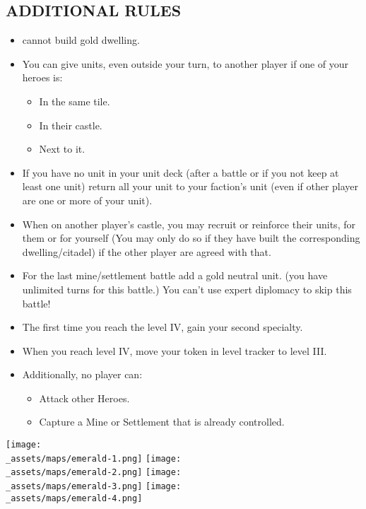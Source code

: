 \begin{multicols*}{2}
\subsection*{\MakeUppercase{Additional Rules}}
\begin{itemize}
    \item cannot build gold dwelling.
    \item You can give units, even outside your turn, to another player if one of your heroes is:
    \begin{itemize}
        \item In the same tile. 
        \item In their castle.
        \item Next to it.
    \end{itemize}
    \item If you have no unit in your unit deck (after a battle or if you not keep at least one unit) return all your unit to your faction's unit (even if other player are one or more of your unit).
    \item When on another player's castle, you may recruit or reinforce their units, for them or for yourself (You may only do so if they have built the corresponding dwelling/citadel) if the other player are agreed with that.
    \item For the last mine/settlement battle add a gold neutral unit. (you have unlimited turns for this battle.) You can't use expert diplomacy to skip this battle!
    \item The first time you reach the level IV, gain your second specialty.
    \item When you reach level IV, move your token in level tracker to level III.
    \item Additionally, no player can:
    \begin{itemize}
        \item Attack other Heroes.
        \item Capture a Mine or Settlement that is already controlled.
    \end{itemize}
\end{itemize}

\vspace{3em}

\begin{center}
  \texttt{[image: \\\_assets/maps/emerald-1.png]}
  \vspace{3em}
  \texttt{[image: \\\_assets/maps/emerald-2.png]}
  \vspace{3em}
  \texttt{[image: \\\_assets/maps/emerald-3.png]}
  \vspace{3em}
  \texttt{[image: \\\_assets/maps/emerald-4.png]}
\end{center}

\end{multicols*}
